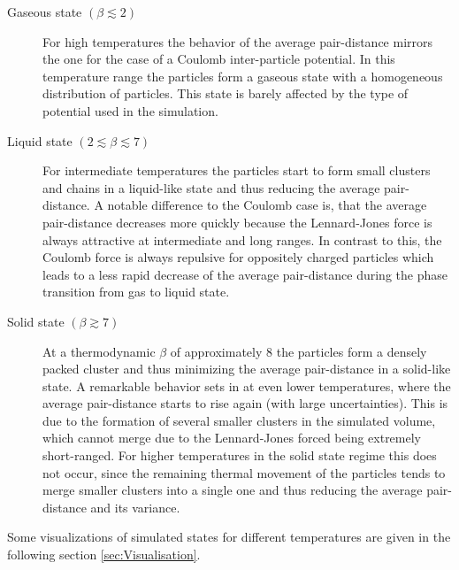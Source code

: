 \documentclass[11pt, a4paper]{article}
\numberwithin{equation}{section}
\begin{document}
\begin{description}
	\item[Gaseous state $(\beta \lesssim 2)$]
		For high temperatures the behavior of the average pair-distance mirrors the one for the case of a Coulomb inter-particle potential.
		In this temperature range the particles form a gaseous state with a homogeneous distribution of particles.
		This state is barely affected by the type of potential used in the simulation.
	
	\item[Liquid state $(2 \lesssim \beta \lesssim 7)$]
		For intermediate temperatures the particles start to form small clusters and chains in a liquid-like state and thus reducing the average pair-distance.
		A notable difference to the Coulomb case is, that the average pair-distance decreases more quickly because the Lennard-Jones force is always attractive at intermediate and long ranges.
		In contrast to this, the Coulomb force is always repulsive for oppositely charged particles which leads to a less rapid decrease of the average pair-distance during the phase transition from gas to liquid state.		
	
	\item[Solid state $(\beta \gtrsim 7)$]
		At a thermodynamic $\beta$ of approximately 8 the particles form a densely packed cluster and thus minimizing the average pair-distance in a solid-like state.
		A remarkable behavior sets in at even lower temperatures, where the average pair-distance starts to rise again (with large uncertainties).
		This is due to the formation of several smaller clusters in the simulated volume, which cannot merge due to the Lennard-Jones forced being extremely short-ranged.
		For higher temperatures in the solid state regime this does not occur, since the remaining thermal movement of the particles tends to merge smaller clusters into a single one and thus reducing the average pair-distance and its variance.	
\end{description}
Some visualizations of simulated states for different temperatures are given in the following section \ref{sec:Visualisation}.
\end{document}
